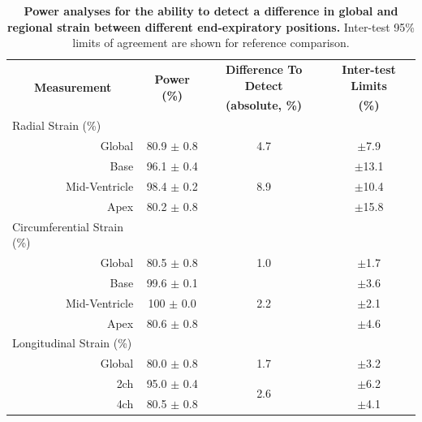 	\begin{table}
		\centering
		\caption[Power analyses for the ability to detect a difference in global and regional strain between different end-expiratory positions]{\textbf{Power analyses for the ability to detect a difference in global and regional strain between different end-expiratory positions.} Inter-test 95\% limits of agreement are shown for reference comparison.}
		\label{table:strainDifferencesPower}
		\begin{tabular}{c c c c}
			\toprule
			\multirow{2}{*}{\textbf{Measurement}} & \multirow{2}{*}{\textbf{Power (\%)}} & \textbf{Difference To Detect} & \textbf{Inter-test Limits} \\
			 & & \textbf{(absolute, \%)} & \textbf{(\%)} \\
			\midrule
			\multicolumn{1}{l}{Radial Strain (\%)} & & &                                            \\
			\multicolumn{1}{r}{Global}  	  & 80.9 $\pm$ 0.8 & 4.7                  & $\pm$7.9    \\
			\multicolumn{1}{r}{Base}  		  & 96.1 $\pm$ 0.4 & \multirow{3}{*}{8.9} & $\pm$13.1   \\
			\multicolumn{1}{r}{Mid-Ventricle} & 98.4 $\pm$ 0.2 &                      & $\pm$10.4   \\
			\multicolumn{1}{r}{Apex}  		  & 80.2 $\pm$ 0.8 &                      & $\pm$15.8   \\
			\multicolumn{1}{l}{Circumferential Strain (\%)} & & &                                   \\
			\multicolumn{1}{r}{Global}  	  & 80.5 $\pm$ 0.8 & 1.0                  & $\pm$1.7    \\
			\multicolumn{1}{r}{Base}  		  & 99.6 $\pm$ 0.1 & \multirow{3}{*}{2.2} & $\pm$3.6    \\
			\multicolumn{1}{r}{Mid-Ventricle} & 100 $\pm$ 0.0  &                      & $\pm$2.1    \\
			\multicolumn{1}{r}{Apex}  		  & 80.6 $\pm$ 0.8 &                      & $\pm$4.6    \\
			\multicolumn{1}{l}{Longitudinal Strain (\%)} & & &	    				                \\
			\multicolumn{1}{r}{Global}        & 80.0 $\pm$ 0.8 & 1.7                  & $\pm$3.2    \\
			\multicolumn{1}{r}{2ch}  		  & 95.0 $\pm$ 0.4 & \multirow{2}{*}{2.6} & $\pm$6.2    \\
			\multicolumn{1}{r}{4ch}  		  & 80.5 $\pm$ 0.8 &     				  & $\pm$4.1    \\ 
			\bottomrule
		\end{tabular}
	\end{table} 

